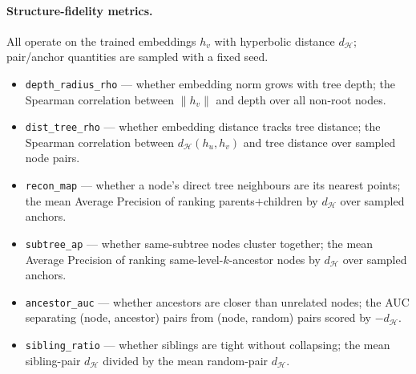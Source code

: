 \paragraph{Structure-fidelity metrics.} All operate on the trained embeddings
$h_v$ with hyperbolic distance $d_{\mathcal{H}}$; pair/anchor quantities are
sampled with a fixed seed.
\begin{itemize}
  \item \texttt{depth\_radius\_rho} --- whether embedding norm grows with tree
        depth; the Spearman correlation between $\lVert h_v\rVert$ and depth over
        all non-root nodes.
  \item \texttt{dist\_tree\_rho} --- whether embedding distance tracks tree
        distance; the Spearman correlation between $d_{\mathcal{H}}(h_u,h_v)$ and
        tree distance over sampled node pairs.
  \item \texttt{recon\_map} --- whether a node's direct tree neighbours are its
        nearest points; the mean Average Precision of ranking parents$+$children
        by $d_{\mathcal{H}}$ over sampled anchors.
  \item \texttt{subtree\_ap} --- whether same-subtree nodes cluster together; the
        mean Average Precision of ranking same-level-$k$-ancestor nodes by
        $d_{\mathcal{H}}$ over sampled anchors.
  \item \texttt{ancestor\_auc} --- whether ancestors are closer than unrelated
        nodes; the AUC separating (node, ancestor) pairs from (node, random) pairs
        scored by $-d_{\mathcal{H}}$.
  \item \texttt{sibling\_ratio} --- whether siblings are tight without collapsing;
        the mean sibling-pair $d_{\mathcal{H}}$ divided by the mean random-pair
        $d_{\mathcal{H}}$.
\end{itemize}

